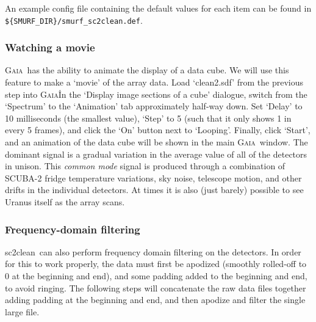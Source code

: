 \documentclass[twoside,11pt]{article}
\newcommand{\gaia}{\xref{\textsc{Gaia}}{sun214}{}}
\newcommand{\task}[1]{\textsf{#1}}
\newcommand{\clean}{\xref{\task{sc2clean}}{sun258}{SC2CLEAN}}
\newcommand{\xref}[3]{#1}
\newcommand{\xlabel}[1]{}
\renewcommand{\_}{\texttt{\symbol{95}}}
\begin{document}
An example config file containing the default values for each item
can be found in \verb|${SMURF_DIR}/smurf_sc2clean.def|.

\subsubsection{\xlabel{movie}Watching a movie}

\gaia\ has the ability to animate the display of a data cube. We will
use this feature to make a `movie' of the array data. Load
`clean2.sdf' from the previous step into \gaia\. In the `Display image
sections of a cube' dialogue, switch from the `Spectrum' to the
`Animation' tab approximately half-way down.  Set `Delay' to 10
milliseconds (the smallest value), `Step' to 5 (such that it only
shows 1 in every 5 frames), and click the `On' button next to
`Looping'. Finally, click `Start', and an animation of the data cube
will be shown in the main \gaia\ window. The dominant signal is a
gradual variation in the average value of all of the detectors in
unison. This {\em common mode} signal is produced through a
combination of SCUBA-2 fridge temperature variations, sky noise,
telescope motion, and other drifts in the individual detectors. At
times it is also (just barely) possible to see Uranus itself as the
array scans.

\subsubsection{\xlabel{fftfilter}Frequency-domain filtering}

\clean\ can also perform frequency domain filtering on the
detectors. In order for this to work properly, the data must first be
apodized (smoothly rolled-off to 0 at the beginning and end), and some
padding added to the beginning and end, to avoid ringing. The
following steps will concatenate the raw data files together adding
padding at the beginning and end, and then apodize and filter the
single large file.
\end{document}
